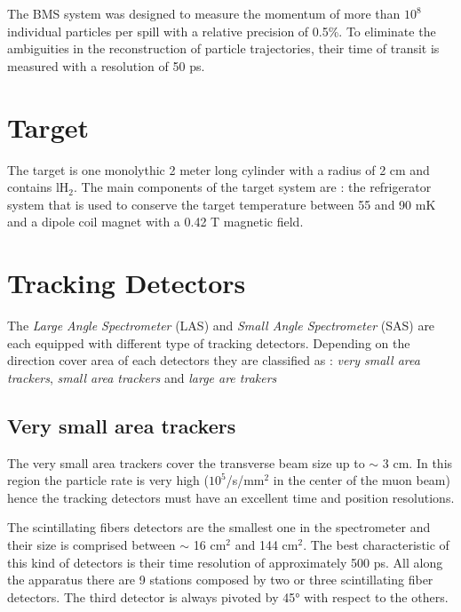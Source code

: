 The BMS system was designed to measure the momentum of more than $10^8$ individual particles per spill with a relative precision
of 0.5\%. To eliminate the ambiguities in the reconstruction of particle trajectories, their time of transit is measured with
a resolution of 50 ps.


\section{Target}

The target is one monolythic 2 meter long cylinder with a radius of 2 cm and contains lH$_2$. The main components of the target
system are : the refrigerator system that is used to conserve the target temperature between 55 and 90 mK and a dipole coil
magnet with a 0.42 T magnetic field.


\section{Tracking Detectors}

The \textit{Large Angle Spectrometer} (LAS) and \textit{Small Angle Spectrometer} (SAS) are each equipped with different type
of tracking detectors. Depending on the direction cover area of each detectors they are classified as :
\textit{very small area trackers}, \textit{small area trackers} and \textit{large are trakers}

\subsection*{Very small area trackers}

The very small area trackers cover the transverse beam size up to $\sim$ 3 cm. In this region the particle rate is very
high ($10^5$/s/mm$^2$ in the center of the muon beam) hence the tracking detectors must have an excellent time and position
resolutions.

The scintillating fibers detectors are the smallest one in the spectrometer and their size is comprised between $\sim$ 16 cm$^2$
and 144 cm$^2$. The best characteristic of this kind of detectors is their time resolution of approximately 500 ps. All along the
apparatus there are 9 stations composed by two or three scintillating fiber detectors. The third detector is always pivoted by 45°
with respect to the others.

